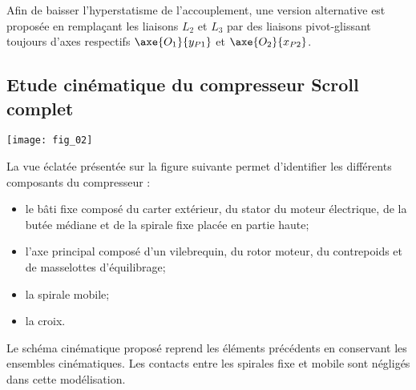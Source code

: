 

Afin de baisser l’hyperstatisme de l’accouplement, une version alternative est proposée en 
remplaçant les liaisons $L_2$ et $L_3$ par des liaisons pivot-glissant toujours d’axes respectifs
$\axe{O_1}{y_{P1}}$ et $\axe{O_2}{x_{P2}}$.






\subsection*{Etude cinématique du compresseur Scroll complet}

\begin{marginfigure}[-2cm]%
\texttt{[image: fig\_02]}
\end{marginfigure}

La vue éclatée présentée sur la figure suivante permet d’identifier les différents composants du compresseur :
\begin{itemize}
\item le bâti fixe composé du carter extérieur, du stator du moteur électrique, de la butée médiane et de la spirale fixe placée en partie haute;
\item l’axe principal composé d’un vilebrequin, du rotor moteur, du contrepoids et de masselottes d’équilibrage;
\item la spirale mobile;
\item la croix.
\end{itemize}




Le schéma cinématique proposé reprend les éléments précédents en 
conservant les ensembles cinématiques.
Les contacts entre les spirales fixe et mobile sont négligés dans cette modélisation.




